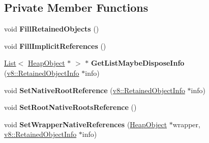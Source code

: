 \subsection*{Private Member Functions}
\begin{DoxyCompactItemize}
\item 
void {\bfseries Fill\+Retained\+Objects} ()\hypertarget{classv8_1_1internal_1_1_native_objects_explorer_adbbe44aa8b37d6cffa2f49ef3c07df4d}{}\label{classv8_1_1internal_1_1_native_objects_explorer_adbbe44aa8b37d6cffa2f49ef3c07df4d}

\item 
void {\bfseries Fill\+Implicit\+References} ()\hypertarget{classv8_1_1internal_1_1_native_objects_explorer_a4395ae19d962dc90fc4eac9e0f5f5119}{}\label{classv8_1_1internal_1_1_native_objects_explorer_a4395ae19d962dc90fc4eac9e0f5f5119}

\item 
\hyperlink{classv8_1_1internal_1_1_list}{List}$<$ \hyperlink{classv8_1_1internal_1_1_heap_object}{Heap\+Object} $\ast$ $>$ $\ast$ {\bfseries Get\+List\+Maybe\+Dispose\+Info} (\hyperlink{classv8_1_1_retained_object_info}{v8\+::\+Retained\+Object\+Info} $\ast$info)\hypertarget{classv8_1_1internal_1_1_native_objects_explorer_accba1555c9b71d600e887c291201d886}{}\label{classv8_1_1internal_1_1_native_objects_explorer_accba1555c9b71d600e887c291201d886}

\item 
void {\bfseries Set\+Native\+Root\+Reference} (\hyperlink{classv8_1_1_retained_object_info}{v8\+::\+Retained\+Object\+Info} $\ast$info)\hypertarget{classv8_1_1internal_1_1_native_objects_explorer_a275ceb3039bddc05f319dfbfd911eabb}{}\label{classv8_1_1internal_1_1_native_objects_explorer_a275ceb3039bddc05f319dfbfd911eabb}

\item 
void {\bfseries Set\+Root\+Native\+Roots\+Reference} ()\hypertarget{classv8_1_1internal_1_1_native_objects_explorer_a29c373fb4ee264afea9181c08d6b7ee2}{}\label{classv8_1_1internal_1_1_native_objects_explorer_a29c373fb4ee264afea9181c08d6b7ee2}

\item 
void {\bfseries Set\+Wrapper\+Native\+References} (\hyperlink{classv8_1_1internal_1_1_heap_object}{Heap\+Object} $\ast$wrapper, \hyperlink{classv8_1_1_retained_object_info}{v8\+::\+Retained\+Object\+Info} $\ast$info)\hypertarget{classv8_1_1internal_1_1_native_objects_explorer_aaae1eeab904aa01c45dc002f7227a09e}{}\label{classv8_1_1internal_1_1_native_objects_explorer_aaae1eeab904aa01c45dc002f7227a09e}


\end{DoxyCompactItemize}
